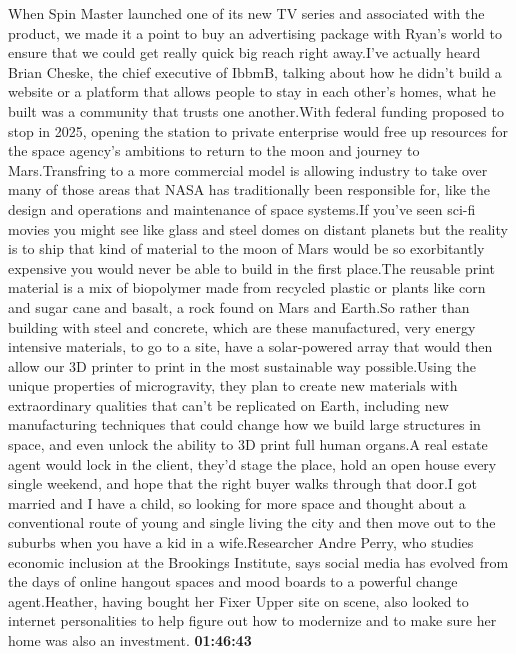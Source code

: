 \documentclass{article}%
\begin{document}
When Spin Master launched one of its new TV series and associated with the product, we made it a point to buy an advertising package with Ryan's world to ensure that we could get really quick big reach right away.I've actually heard Brian Cheske, the chief executive of IbbmB, talking about how he didn't build a website or a platform that allows people to stay in each other's homes, what he built was a community that trusts one another.With federal funding proposed to stop in 2025, opening the station to private enterprise would free up resources for the space agency's ambitions to return to the moon and journey to Mars.Transfring to a more commercial model is allowing industry to take over many of those areas that NASA has traditionally been responsible for, like the design and operations and maintenance of space systems.If you've seen sci{-}fi movies you might see like glass and steel domes on distant planets but the reality is to ship that kind of material to the moon of Mars would be so exorbitantly expensive you would never be able to build in the first place.The reusable print material is a mix of biopolymer made from recycled plastic or plants like corn and sugar cane and basalt, a rock found on Mars and Earth.So rather than building with steel and concrete, which are these manufactured, very energy intensive materials, to go to a site, have a solar{-}powered array that would then allow our 3D printer to print in the most sustainable way possible.Using the unique properties of microgravity, they plan to create new materials with extraordinary qualities that can't be replicated on Earth, including new manufacturing techniques that could change how we build large structures in space, and even unlock the ability to 3D print full human organs.A real estate agent would lock in the client, they'd stage the place, hold an open house every single weekend, and hope that the right buyer walks through that door.I got married and I have a child, so looking for more space and thought about a conventional route of young and single living the city and then move out to the suburbs when you have a kid in a wife.Researcher Andre Perry, who studies economic inclusion at the Brookings Institute, says social media has evolved from the days of online hangout spaces and mood boards to a powerful change agent.Heather, having bought her Fixer Upper site on scene, also looked to internet personalities to help figure out how to modernize and to make sure her home was also an investment.%
\textbf{01:46:43}%
\newline%
\end{document}
